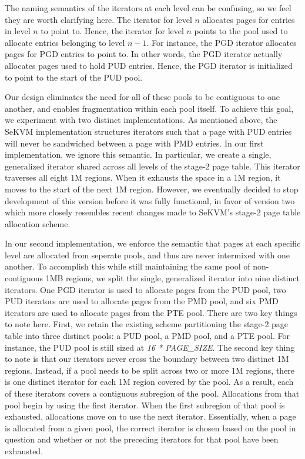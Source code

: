 The naming semantics of the iterators at each level can be confusing, so we feel they are worth
clarifying here. The iterator for level $n$ allocates pages for entries in level $n$ to point to.
Hence, the iterator for level $n$ points to the pool used to allocate
entries belonging to level $n-1$. For instance, the PGD iterator allocates pages
for PGD entries to point to. In other words, the PGD iterator actually allocates
pages used to hold PUD entries. Hence, the PGD iterator is initialized to point to the start of the PUD pool.

Our design eliminates the need for all of these pools to be contiguous to
one another, and enables fragmentation within each pool itself. To achieve this goal,
we experiment with two distinct implementations. As mentioned above, the SeKVM implementation
structures iterators such that a page with PUD entries will never be sandwiched between a page with PMD entries.
In our first implementation, we ignore this semantic. In particular, we create a single,
generalized iterator shared across all levels of the stage-2 page table. This
iterator traverses all eight 1M regions. When it exhausts the space in a 1M region, it moves
to the start of the next 1M region. However, we eventually decided to stop development of this
version before it was fully functional, in favor of version two which more closely resembles recent changes made to SeKVM's
stage-2 page table allocation scheme.

In our second implementation, we enforce the semantic that pages at each specific level are
allocated from seperate pools, and thus are never intermixed with one another. To accomplish
this while still maintaining the same pool of non-contiguous 1MB regions,
we split the single, generalized iterator into nine distinct iterators. 
One PGD iterator is used to allocate pages from the PUD pool, two PUD iterators are used to allocate pages from the PMD pool,
and six PMD iterators are used to allocate pages from the PTE pool. There are two key things to
note here. First, we retain the existing scheme partitioning the stage-2 page table into
three distinct pools: a PUD pool, a PMD pool, and a PTE pool.
For instance, the PUD pool is still sized at \textit{16 * PAGE\_SIZE}. The
second key thing to note is that our iterators never cross the boundary
between two distinct 1M regions. Instead, if a pool needs to be split across
two or more 1M regions, there is one distinct iterator for each 1M region
covered by the pool. As a result, each of these iterators covers a contiguous subregion of the pool.
Allocations from that pool begin by using the first iterator. When the first
subregion of that pool is exhausted, allocations move on to use the next iterator.
Essentially, when a page is allocated from a given pool, the correct iterator is chosen based on
the pool in question and whether or not the preceding iterators for that pool have been exhausted.


